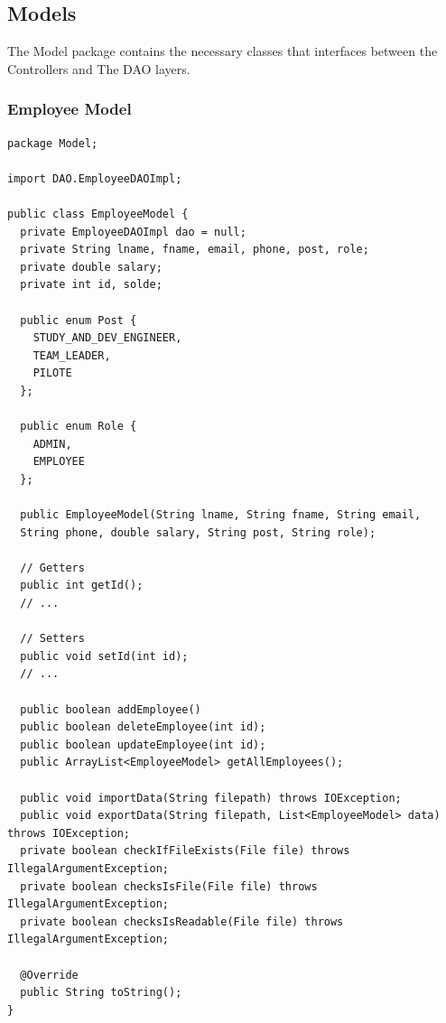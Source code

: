 \documentclass[12pt]{article}
\begin{document}
\pagebreak

\subsection{Models}

The Model package contains the necessary classes that interfaces
between the Controllers and The DAO layers.

\subsubsection{Employee Model}
\begin{lstlisting}
package Model;

import DAO.EmployeeDAOImpl;

public class EmployeeModel {
  private EmployeeDAOImpl dao = null;
  private String lname, fname, email, phone, post, role;
  private double salary;
  private int id, solde;

  public enum Post {
    STUDY_AND_DEV_ENGINEER,
    TEAM_LEADER,
    PILOTE
  };

  public enum Role {
    ADMIN,
    EMPLOYEE
  };

  public EmployeeModel(String lname, String fname, String email,
  String phone, double salary, String post, String role);

  // Getters
  public int getId();
  // ...

  // Setters
  public void setId(int id);
  // ...

  public boolean addEmployee()
  public boolean deleteEmployee(int id);
  public boolean updateEmployee(int id);
  public ArrayList<EmployeeModel> getAllEmployees();

  public void importData(String filepath) throws IOException;
  public void exportData(String filepath, List<EmployeeModel> data) throws IOException;
  private boolean checkIfFileExists(File file) throws IllegalArgumentException;
  private boolean checksIsFile(File file) throws IllegalArgumentException;
  private boolean checksIsReadable(File file) throws IllegalArgumentException;

  @Override
  public String toString();
}
\end{lstlisting}

\pagebreak
\end{document}

